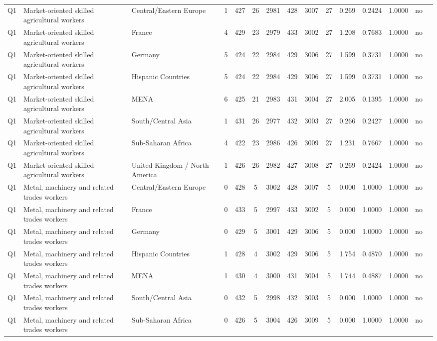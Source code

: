 \begin{longtable}{lllrcccccccccll}
Q1 & Market-oriented skilled agricultural workers & Central/Eastern Europe & 1 & 427 & 26 & 2981 & 428 & 3007 & 27 & 0.269 & 0.2424 & 1.0000 & no \\
Q1 & Market-oriented skilled agricultural workers & France & 4 & 429 & 23 & 2979 & 433 & 3002 & 27 & 1.208 & 0.7683 & 1.0000 & no \\
Q1 & Market-oriented skilled agricultural workers & Germany & 5 & 424 & 22 & 2984 & 429 & 3006 & 27 & 1.599 & 0.3731 & 1.0000 & no \\
Q1 & Market-oriented skilled agricultural workers & Hispanic Countries & 5 & 424 & 22 & 2984 & 429 & 3006 & 27 & 1.599 & 0.3731 & 1.0000 & no \\
Q1 & Market-oriented skilled agricultural workers & MENA & 6 & 425 & 21 & 2983 & 431 & 3004 & 27 & 2.005 & 0.1395 & 1.0000 & no \\
Q1 & Market-oriented skilled agricultural workers & South/Central Asia & 1 & 431 & 26 & 2977 & 432 & 3003 & 27 & 0.266 & 0.2427 & 1.0000 & no \\
Q1 & Market-oriented skilled agricultural workers & Sub-Saharan Africa & 4 & 422 & 23 & 2986 & 426 & 3009 & 27 & 1.231 & 0.7667 & 1.0000 & no \\
Q1 & Market-oriented skilled agricultural workers & United Kingdom / North America & 1 & 426 & 26 & 2982 & 427 & 3008 & 27 & 0.269 & 0.2424 & 1.0000 & no \\
Q1 & Metal, machinery and related trades workers & Central/Eastern Europe & 0 & 428 & 5 & 3002 & 428 & 3007 & 5 & 0.000 & 1.0000 & 1.0000 & no \\
Q1 & Metal, machinery and related trades workers & France & 0 & 433 & 5 & 2997 & 433 & 3002 & 5 & 0.000 & 1.0000 & 1.0000 & no \\
Q1 & Metal, machinery and related trades workers & Germany & 0 & 429 & 5 & 3001 & 429 & 3006 & 5 & 0.000 & 1.0000 & 1.0000 & no \\
Q1 & Metal, machinery and related trades workers & Hispanic Countries & 1 & 428 & 4 & 3002 & 429 & 3006 & 5 & 1.754 & 0.4870 & 1.0000 & no \\
Q1 & Metal, machinery and related trades workers & MENA & 1 & 430 & 4 & 3000 & 431 & 3004 & 5 & 1.744 & 0.4887 & 1.0000 & no \\
Q1 & Metal, machinery and related trades workers & South/Central Asia & 0 & 432 & 5 & 2998 & 432 & 3003 & 5 & 0.000 & 1.0000 & 1.0000 & no \\
Q1 & Metal, machinery and related trades workers & Sub-Saharan Africa & 0 & 426 & 5 & 3004 & 426 & 3009 & 5 & 0.000 & 1.0000 & 1.0000 & no \\

\end{longtable}
